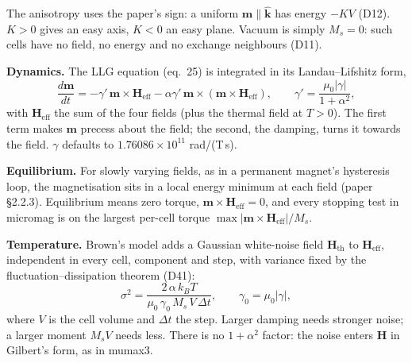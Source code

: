 \documentclass[10pt,a4paper]{article}
\newcommand{\mo}{\mu_0}
\newcommand{\vm}{\mathbf{m}}
\newcommand{\vH}{\mathbf{H}}
\newcommand{\kh}{\hat{\mathbf{k}}}
\newcommand{\dec}[1]{\textcolor{comment}{\small(#1)}}
\begin{document}
\begin{table}[h]
\centering\small
\caption{The energy terms. Equation numbers refer to Fischbacher \emph{et al.}\ (2018).}
\label{tab:terms}
\renewcommand{\arraystretch}{1.9}
\end{table}

The anisotropy uses the paper's sign: a uniform $\vm \parallel \kh$ has energy $-KV$ \dec{D12}. $K > 0$ gives an easy
axis, $K < 0$ an easy plane. Vacuum is simply $M_s = 0$: such cells have no field, no energy and no exchange neighbours
\dec{D11}.

\textbf{Dynamics.} The LLG equation (eq.~25) is integrated in its Landau--Lifshitz form,
\[
  \frac{d\vm}{dt} = -\gamma'\,\vm\times\vH_\mathrm{eff} - \alpha\gamma'\,\vm\times(\vm\times\vH_\mathrm{eff}),
  \qquad \gamma' = \frac{\mo|\gamma|}{1+\alpha^2},
\]
with $\vH_\mathrm{eff}$ the sum of the four fields (plus the thermal field at $T>0$). The first term makes $\vm$ precess
about the field; the second, the damping, turns it towards the field. $\gamma$ defaults to $1.76086\times10^{11}$
rad/(T\,s).

\textbf{Equilibrium.} For slowly varying fields, as in a permanent magnet's hysteresis loop, the magnetisation sits in a
local energy minimum at each field (paper \S2.2.3). Equilibrium means zero torque, $\vm\times\vH_\mathrm{eff} = 0$, and
every stopping test in micromag is on the largest per-cell torque $\max|\vm\times\vH_\mathrm{eff}|/M_s$.

\textbf{Temperature.} Brown's model adds a Gaussian white-noise field $\vH_\mathrm{th}$ to $\vH_\mathrm{eff}$,
independent in every cell, component and step, with variance fixed by the fluctuation--dissipation theorem
\dec{D41}:
\[
  \sigma^2 = \frac{2\,\alpha\,k_B T}{\mo\,\gamma_0\,M_s\,V\,\Delta t}, \qquad \gamma_0 = \mo|\gamma|,
\]
where $V$ is the cell volume and $\Delta t$ the step. Larger damping needs stronger noise; a larger moment $M_sV$ needs
less. There is no $1+\alpha^2$ factor: the noise enters $\vH$ in Gilbert's form, as in mumax3.
\end{document}
